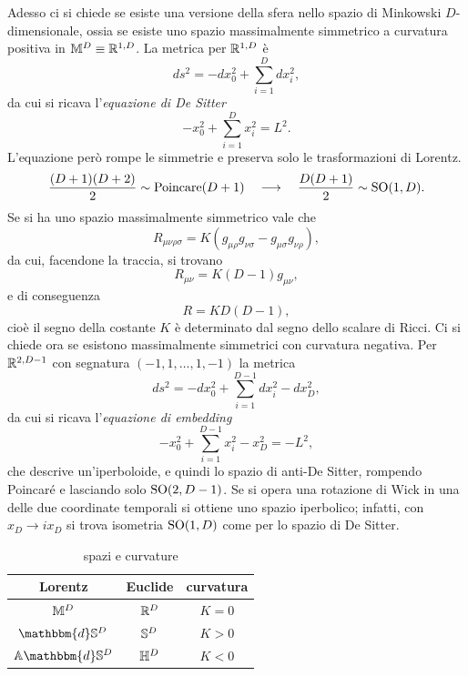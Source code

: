 Adesso ci si chiede se esiste una versione della sfera nello spazio di Minkowski $D$-dimensionale, ossia se esiste uno spazio massimalmente simmetrico a curvatura positiva in $\mathbb{M}^D \equiv \mathbb{R}^{1,D}$. La metrica per $\mathbb{R}^{1,D}$ è 
\begin{equation}
    ds^2 = -dx_0^2 + \sum_{i=1}^D dx_i^2,
\end{equation}
da cui si ricava l'\emph{equazione di De Sitter}
\begin{equation}
    -x_0^2 + \sum_{i=1}^D x_i^2 = L^2.
\end{equation}
L'equazione però rompe le simmetrie e preserva solo le trasformazioni di Lorentz.
\begin{equation}
    \frac{(D + 1)(D + 2)}{2} \sim \mathrm{Poincare}(D + 1)\quad\longrightarrow\quad \frac{D(D + 1)}{2} \sim \mathrm{SO}(1, D).
\end{equation}
Se si ha uno spazio massimalmente simmetrico vale che 
\begin{equation}
    R_{\mu\nu\rho\sigma} = K(g_{\mu\rho}g_{\nu\sigma} - g_{\mu\sigma}g_{\nu\rho}),
\end{equation}
da cui, facendone la traccia, si trovano 
\begin{equation}
    R_{\mu\nu} = K(D - 1)g_{\mu\nu},
\end{equation}
e di conseguenza
\begin{equation}
    R = KD(D - 1),
\end{equation}
cioè il segno della costante $K$ è determinato dal segno dello scalare di Ricci. Ci si chiede ora se esistono massimalmente simmetrici con curvatura negativa. Per $\mathbb{R}^{2,D - 1}$ con segnatura $(-1,1,\dots,1,-1)$ la metrica 
\begin{equation}
    ds^2 = -dx_0^2 + \sum_{i=1}^{D - 1}dx_i^2 - dx_D^2,
\end{equation}
da cui si ricava l'\emph{equazione di embedding}
\begin{equation}
    -x_0^2 + \sum_{i=1}^{D - 1}x_i^2 - x_D^2 = -L^2,
\end{equation}
che descrive un'iperboloide, e quindi lo spazio di anti-De Sitter, rompendo Poincaré e lasciando solo $\mathrm{SO}(2, D - 1)$. Se si opera una rotazione di Wick in una delle due coordinate temporali si ottiene uno spazio iperbolico; infatti, con $x_D \to ix_D$ si trova isometria $\mathrm{SO}(1,D)$ come per lo spazio di De Sitter.
\begin{table}[ht]
    \centering 
    \begin{tabular}{|ccc|}
        \hline
        Lorentz & Euclide & curvatura \\ \hline
        $\mathbb{M}^D$ & $\mathbb{R}^D$ & $K = 0$ \\
        $\mathbbm{d}\bb{S}^D$ & $\mathbb{S}^D$ & $K > 0$ \\
        $\bb{A}\mathbbm{d}\bb{S}^D$ & $\mathbb{H}^D$ & $K < 0$ \\
        \hline
    \end{tabular}
    \label{tab: spazi e curvature}
    \caption{spazi e curvature}
\end{table}

